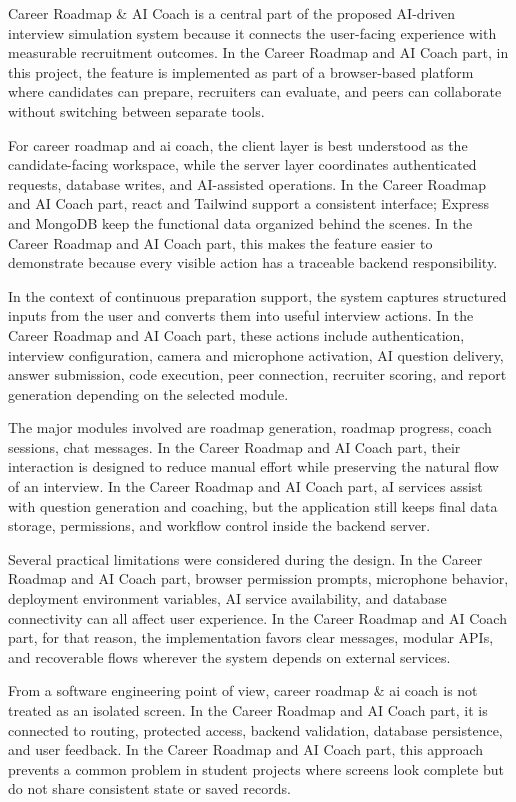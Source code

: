 \documentclass[12pt,a4paper]{report}
\begin{document}
Career Roadmap \& AI Coach is a central part of the proposed AI-driven interview simulation system because it connects the user-facing experience with measurable recruitment outcomes. In the Career Roadmap and AI Coach part, in this project, the feature is implemented as part of a browser-based platform where candidates can prepare, recruiters can evaluate, and peers can collaborate without switching between separate tools.


For career roadmap and ai coach, the client layer is best understood as the candidate-facing workspace, while the server layer coordinates authenticated requests, database writes, and AI-assisted operations. In the Career Roadmap and AI Coach part, react and Tailwind support a consistent interface; Express and MongoDB keep the functional data organized behind the scenes. In the Career Roadmap and AI Coach part, this makes the feature easier to demonstrate because every visible action has a traceable backend responsibility.


In the context of continuous preparation support, the system captures structured inputs from the user and converts them into useful interview actions. In the Career Roadmap and AI Coach part, these actions include authentication, interview configuration, camera and microphone activation, AI question delivery, answer submission, code execution, peer connection, recruiter scoring, and report generation depending on the selected module.


The major modules involved are roadmap generation, roadmap progress, coach sessions, chat messages. In the Career Roadmap and AI Coach part, their interaction is designed to reduce manual effort while preserving the natural flow of an interview. In the Career Roadmap and AI Coach part, aI services assist with question generation and coaching, but the application still keeps final data storage, permissions, and workflow control inside the backend server.


Several practical limitations were considered during the design. In the Career Roadmap and AI Coach part, browser permission prompts, microphone behavior, deployment environment variables, AI service availability, and database connectivity can all affect user experience. In the Career Roadmap and AI Coach part, for that reason, the implementation favors clear messages, modular APIs, and recoverable flows wherever the system depends on external services.


From a software engineering point of view, career roadmap \& ai coach is not treated as an isolated screen. In the Career Roadmap and AI Coach part, it is connected to routing, protected access, backend validation, database persistence, and user feedback. In the Career Roadmap and AI Coach part, this approach prevents a common problem in student projects where screens look complete but do not share consistent state or saved records.
\end{document}
